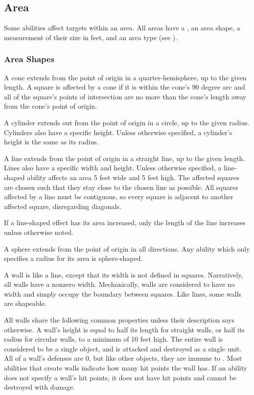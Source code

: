   \subsection{Area}\label{Area}

    Some abilities affect targets within an area.
    All areas have a , an area shape, a measurement of their size in feet, and an area type (see ).

    \subsubsection{Area Shapes}\label{Area Shapes}

       A cone extends from the point of origin in a quarter-hemisphere, up to the given length.
      A square is affected by a cone if it is within the cone's 90 degree arc and all of the square's points of intersection are no more than the cone's length away from the cone's point of origin.

       A cylinder extends out from the point of origin in a circle, up to the given radius.
      Cylinders also have a specific height.
      Unless otherwise specified, a cylinder's height is the same as its radius.

       A line extends from the point of origin in a straight line, up to the given length.
      Lines also have a specific width and height.
      Unless otherwise specified, a line-shaped ability affects an area 5 feet wide and 5 feet high.
      The affected squares are chosen such that they stay close to the chosen line as possible.
      All squares affected by a line must be contiguous, so every square is adjacent to another affected square, disregarding diagonals.

      If a line-shaped effect has its area increased, only the length of the line increases unless otherwise noted.

       A sphere extends from the point of origin in all directions.
      Any ability which only specifies a radius for its area is sphere-shaped.

       A wall is like a line, except that its width is not defined in squares.
      Narratively, all walls have a nonzero width.
      Mechanically, walls are considered to have no width and simply occupy the boundary between squares.
      Like lines, some walls are shapeable.

      All walls share the following common properties unless their description says otherwise.
      A wall's height is equal to half its length for straight walls, or half its radius for circular walls, to a minimum of 10 feet high.
      The entire wall is considered to be a single object, and is attacked and destroyed as a single unit.
      All of a wall's defenses are 0, but like other objects, they are immune to .
      Most abilities that create walls indicate how many hit points the wall has.
      If an ability does not specify a wall's hit points, it does not have hit points and cannot be destroyed with damage.

